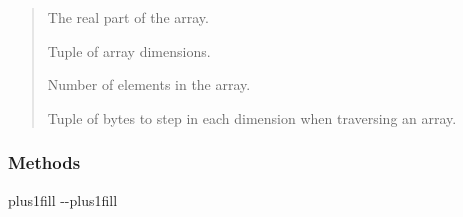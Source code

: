 \documentclass[letterpaper,10pt,english]{sphinxmanual}
\begin{document}
\begin{fulllineitems}
\begin{quote}
\begin{description}
\begin{description}
\sphinxAtStartPar
The real part of the array.

\sphinxAtStartPar
Tuple of array dimensions.

\sphinxAtStartPar
Number of elements in the array.

\sphinxAtStartPar
Tuple of bytes to step in each dimension when traversing an array.

\end{description}

\end{description}\end{quote}
\subsubsection*{Methods}


\begin{savenotes}
\sphinxatlongtablestart
\sphinxthistablewithglobalstyle
\sphinxthistablewithnovlinesstyle
\makeatletter
  \LTleft \@totalleftmargin plus1fill
  \LTright\dimexpr\columnwidth-\@totalleftmargin-\linewidth\relax plus1fill
\makeatother
\begin{longtable}{}
\sphinxtoprule
\endfirsthead

\\
\sphinxtoprule
\endhead

\sphinxbottomrule
{}\\
\endfoot

\endlastfoot
\sphinxtableatstartofbodyhook


\end{longtable}
\end{savenotes}
\end{fulllineitems}
\end{document}
